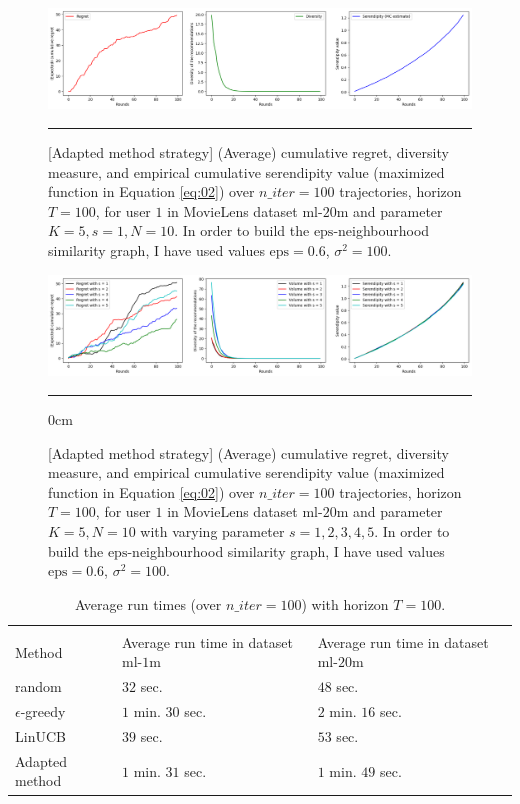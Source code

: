 \documentclass{article}
\begin{document}
\begin{figure}[H]
  \centering
  \rule[-.5cm]{0cm}{4cm}
  \includegraphics[scale=0.4]{../Results/ml-20m/lagree-1min49sec.png}
  \rule[-.5cm]{4cm}{0cm}
  \caption{[Adapted method strategy] (Average) cumulative regret, diversity measure, and empirical cumulative serendipity value (maximized function in Equation \ref{eq:02}) over $n\_iter=100$ trajectories, horizon $T=100$, for user $1$ in MovieLens dataset $\text{ml-20m}$ and parameter $K=5, s=1, N=10$. In order to build the $\text{eps}$-neighbourhood similarity graph, I have used values $\text{eps}=0.6$, $\sigma^{2}=100$.}
\label{figlagree}
\end{figure}

\begin{figure}[H]
  \centering
  \rule[-.5cm]{0cm}{4cm}
  \includegraphics[scale=0.4]{../Results/ml-20m/lagree.png}
  \rule[-.5cm]{4cm}S{0cm}
  \caption{[Adapted method strategy] (Average) cumulative regret, diversity measure, and empirical cumulative serendipity value (maximized function in Equation \ref{eq:02}) over $n\_iter=100$ trajectories, horizon $T=100$, for user $1$ in MovieLens dataset $\text{ml-20m}$ and parameter $K=5, N=10$ with varying parameter $s=1, 2, 3, 4, 5$. In order to build the $\text{eps}$-neighbourhood similarity graph, I have used values $\text{eps}=0.6$, $\sigma^{2}=100$.}
\label{figlagreecomp}
\end{figure}

\begin{table}[H]
  \label{runtimes}
  \centering
  \begin{tabular}{lll}
    \multicolumn{3}{c}{}                   \\
    \cmidrule(r){1-3}
    Method     & Average run time in dataset $\text{ml-1m}$ &  Average run time in dataset $\text{ml-20m}$  \\
    \midrule
    random & $32$ sec. & $48$ sec.  \\
    $\epsilon$-greedy & $1$ min. $30$ sec. & $2$ min. $16$ sec.\\
    LinUCB     & $39$ sec. & $53$ sec.\\
    Adapted method     & $1$ min. $31$ sec. & $1$ min. $49$ sec. \\
    \bottomrule
  \end{tabular}
  \caption{Average run times (over $n\_iter=100$) with horizon $T=100$.}
\end{table}
\end{document}
